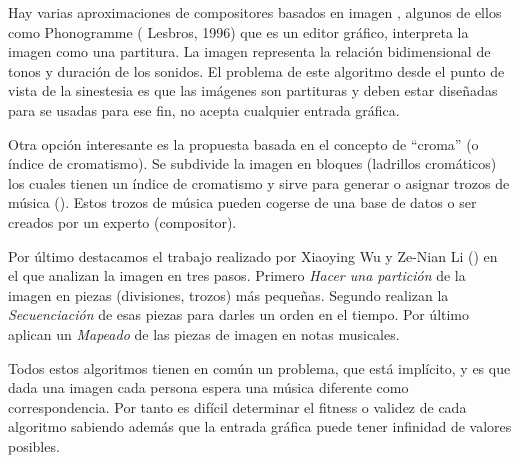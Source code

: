 Hay varias aproximaciones de compositores basados en imagen , algunos de ellos como Phonogramme (\cite{Phonogramme} Lesbros, 1996) que es un editor gráfico, interpreta la imagen como una partitura. La imagen representa la relación bidimensional de tonos y duración de los sonidos. El problema de este algoritmo desde el punto de vista de la sinestesia es que las imágenes son partituras y deben estar diseñadas para se usadas para ese fin, no acepta cualquier entrada gráfica. 

Otra opción interesante es la propuesta basada en el concepto de ``croma'' (o índice de cromatismo). Se subdivide la imagen en bloques (ladrillos cromáticos) los cuales tienen un índice de cromatismo y sirve para generar o asignar trozos de música (\cite{bricksConvertsMusic}). Estos trozos de música pueden cogerse de una base de datos o ser creados por un experto (compositor).

Por último destacamos el trabajo realizado por Xiaoying Wu y Ze-Nian Li (\cite{ImageBaseComposition}) en el que analizan la imagen en tres pasos. Primero \emph{Hacer una partición} de la imagen en piezas (divisiones, trozos) más pequeñas. Segundo realizan la \emph{Secuenciación} de esas piezas para darles un orden en el tiempo. Por último aplican un \emph{Mapeado} de las piezas de imagen en notas musicales.

Todos estos algoritmos tienen en común un problema, que está implícito, y es que dada una imagen cada persona espera una música diferente como correspondencia. Por tanto es difícil determinar el fitness o validez de cada algoritmo sabiendo además que la entrada gráfica puede tener infinidad de valores posibles.

